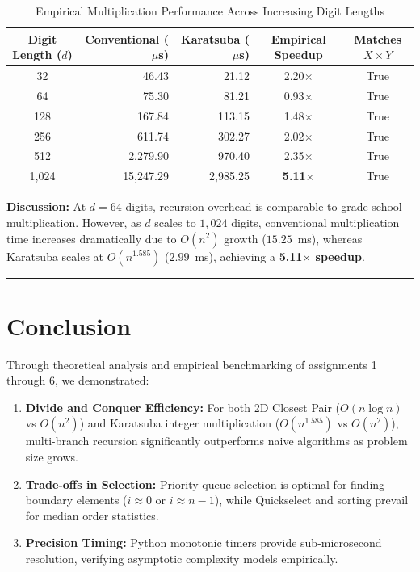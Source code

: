 \documentclass[12pt]{article}
\begin{document}
\begin{table}[H]
\centering
\caption{Empirical Multiplication Performance Across Increasing Digit Lengths}
\vspace{4pt}
\begin{tabular}{crrcc}
\toprule
\textbf{Digit Length ($d$)} & \textbf{Conventional ($\mu$s)} & \textbf{Karatsuba ($\mu$s)} & \textbf{Empirical Speedup} & \textbf{Matches $X \times Y$} \\
\midrule
32   & 46.43     & 21.12    & 2.20$\times$ & True \\
64   & 75.30     & 81.21    & 0.93$\times$ & True \\
128  & 167.84    & 113.15   & 1.48$\times$ & True \\
256  & 611.74    & 302.27   & 2.02$\times$ & True \\
512  & 2,279.90  & 970.40   & 2.35$\times$ & True \\
1,024& 15,247.29 & 2,985.25 & \textbf{5.11$\times$} & True \\
\bottomrule
\end{tabular}
\end{table}

\textbf{Discussion:} At $d=64$ digits, recursion overhead is comparable to grade-school multiplication. However, as $d$ scales to $1,024$ digits, conventional multiplication time increases dramatically due to $O(n^2)$ growth ($15.25$~ms), whereas Karatsuba scales at $O(n^{1.585})$ ($2.99$~ms), achieving a \textbf{5.11$\times$ speedup}.

\vspace{0.3cm}
\hrule
\vspace{0.3cm}

\section{Conclusion}
Through theoretical analysis and empirical benchmarking of assignments 1 through 6, we demonstrated:
\begin{enumerate}
    \item \textbf{Divide and Conquer Efficiency:} For both 2D Closest Pair ($O(n \log n)$ vs $O(n^2)$) and Karatsuba integer multiplication ($O(n^{1.585})$ vs $O(n^2)$), multi-branch recursion significantly outperforms naive algorithms as problem size grows.
    \item \textbf{Trade-offs in Selection:} Priority queue selection is optimal for finding boundary elements ($i \approx 0$ or $i \approx n-1$), while Quickselect and sorting prevail for median order statistics.
    \item \textbf{Precision Timing:} Python monotonic timers provide sub-microsecond resolution, verifying asymptotic complexity models empirically.
\end{enumerate}
\end{document}
